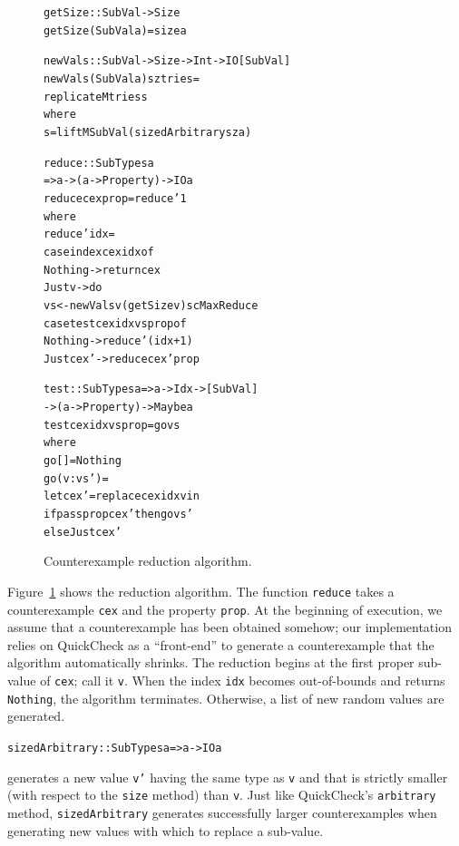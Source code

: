 \documentclass[10pt]{sigplanconf}
\newenvironment{code}{\begin{alltt}}{\end{alltt}}
\newcommand{\ttp}[1]{\texttt{#1}}
\begin{document}
\begin{figure}[ht]
  \begin{code}
getSize :: SubVal -> Size
getSize (SubVal a) = size a

newVals :: SubVal -> Size -> Int -> IO [SubVal]
newVals (SubVal a) sz tries =
  replicateM tries s
  where
  s  = liftM SubVal (sizedArbitrary sz a)

reduce :: SubTypes a
       => a -> (a -> Property) -> IO a
reduce cex prop = reduce' 1
  where
  reduce' idx =
    case index cex idx of
      Nothing -> return cex
      Just v  -> do
        vs <- newVals v (getSize v) scMaxReduce
        case test cex idx vs prop of
          Nothing   -> reduce' (idx+1)
          Just cex' -> reduce cex' prop

test :: SubTypes a => a -> Idx -> [SubVal]
     -> (a -> Property) -> Maybe a
test cex idx vs prop = go vs
  where
  go []      = Nothing
  go (v:vs') =
    let cex' = replace cex idx v in
    if pass prop cex' then go vs'
      else Just cex'
  \end{code}
  \caption{Counterexample reduction algorithm.\label{fig:reduction}}
\end{figure}

Figure~\ref{fig:reduction} shows the reduction algorithm.  The function
\ttp{reduce} takes a counterexample \ttp{cex} and the property \ttp{prop}.  At
the beginning of execution, we assume that a counterexample has been obtained
somehow; our implementation relies on QuickCheck as a ``front-end'' to generate
a counterexample that the algorithm automatically shrinks.  The reduction begins
at the first proper sub-value of \ttp{cex}; call it \ttp{v}.  When the index
\ttp{idx} becomes out-of-bounds and returns \ttp{Nothing}, the algorithm
terminates.  Otherwise, a list of new random values are generated.
%
\begin{code}
sizedArbitrary :: SubTypes a => a -> IO a
\end{code}
%
\noindent
generates a new value \ttp{v'} having the same type as \ttp{v} and that is
strictly smaller (with respect to the \ttp{size} method) than \ttp{v}.  Just
like QuickCheck's \ttp{arbitrary} method, \ttp{sizedArbitrary} generates
successfully larger counterexamples when generating new values with which to
replace a sub-value.

\end{document}
